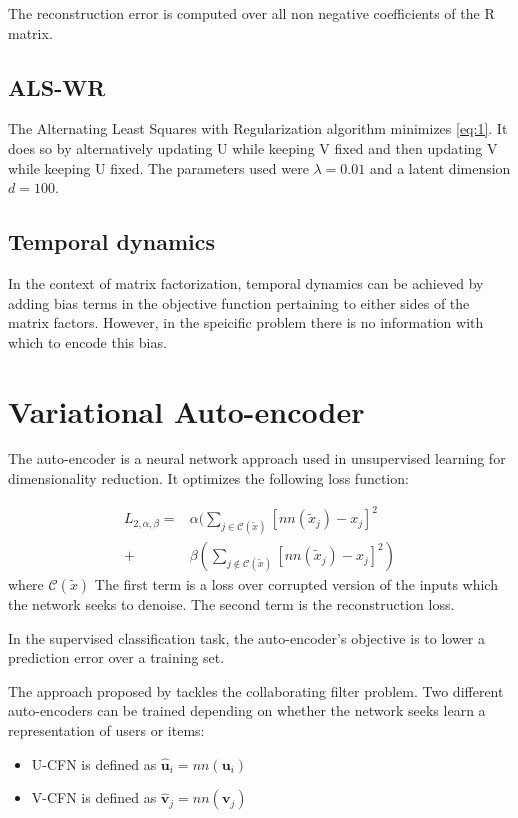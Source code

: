 \documentclass[10pt,twocolumn]{article}
\begin{document}
The reconstruction error is computed over all non negative coefficients of the R matrix. 

\subsection{ALS-WR}

The Alternating Least Squares with Regularization algorithm \cite{zhou2008large}  minimizes \ref{eq:1}.%
It does so by alternatively updating U while keeping V fixed and then updating V while keeping U fixed. 
The parameters used were $\lambda = 0.01$ and a latent dimension $d = 100$.

\subsection{Temporal dynamics}
In the context of matrix factorization, temporal dynamics can be achieved by adding bias terms in the objective function pertaining to either sides of the matrix factors. However, in the speicific problem there is no information with which to encode this bias.

\section{Variational Auto-encoder}

The auto-encoder is a neural network approach used in unsupervised learning for dimensionality reduction. It optimizes the following loss function:

\begin{equation}
\begin{split}
L_{2, \alpha, \beta} = &\alpha ( \sum_{j \in \mathcal{C}(\tilde{x})} [ nn(\tilde{x}_j) - x_j ]^2 \\
+ & \beta ( \sum_{j \notin \mathcal{C}(\tilde{x})} [nn(\tilde{x}_j) - x_j ]^2)
\end{split}
\end{equation}
where $\mathcal{C}(\tilde{x})$ The first term is a loss over corrupted version of the inputs which the network seeks to denoise. The second term is the reconstruction loss.

In the supervised classification task, the auto-encoder's objective is to lower a prediction error over a training set.

The approach proposed by \cite{strub2016hybrid} tackles the collaborating filter problem. Two different auto-encoders can be trained depending on whether the network seeks learn a representation of users or items:
\begin{itemize}
\item U-CFN is defined as $\hat{\textbf{u}}_i = nn(\textbf{u}_i)$
\item V-CFN is defined as $\hat{\textbf{v}}_j = nn(\textbf{v}_j)$ 
\end{itemize}
\end{document}
